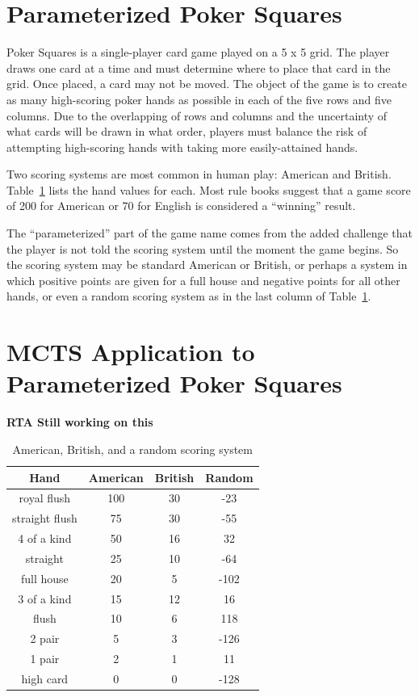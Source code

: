 \documentclass[letterpaper]{article}
\begin{document}
\section{Parameterized Poker Squares}

Poker Squares is a single-player card game played on a 5 x 5 grid. The player draws one card at a time and must determine where to place that card in the grid. Once placed, a card may not be moved. The object of the game is to create as many high-scoring poker hands as possible in each of the five rows and five columns. Due to the overlapping of rows and columns and the uncertainty of what cards will be drawn in what order, players must balance the risk of attempting high-scoring hands with taking more easily-attained hands.

Two scoring systems are most common in human play: American and British. Table~\ref{tbl:scoring} lists the hand values for each. Most rule books suggest that a game score of 200 for American or 70 for English is considered a ``winning'' result.

The ``parameterized'' part of the game name comes from the added challenge that the player is not told the scoring system until the moment the game begins. So the scoring system may be standard American or British, or perhaps a system in which positive points are given for a full house and negative points for all other hands, or even a random scoring system as in the last column of Table~\ref{tbl:scoring}.

\section{MCTS Application to Parameterized Poker Squares}
{\bf RTA Still working on this}

\begin{table}[b]
\caption{American, British, and a random scoring system}
\label{tbl:scoring}
\centering
\begin{tabular}{c c c c}
\hline
Hand & American & British & Random \\
\hline
royal flush     & 100 & 30 & -23 \\
straight flush & 75 & 30 & -55 \\
4 of a kind    & 50 & 16 & 32 \\
straight        & 25 & 10 & -64 \\
full house     & 20 & 5  & -102 \\
3 of a kind   & 15 & 12 & 16 \\
flush           & 10 & 6   & 118 \\
2 pair         & 5   & 3   & -126 \\
1 pair         & 2   & 1   & 11 \\
high card    & 0   & 0   & -128 \\
\hline
\end{tabular}
\end{table}
\end{document}
